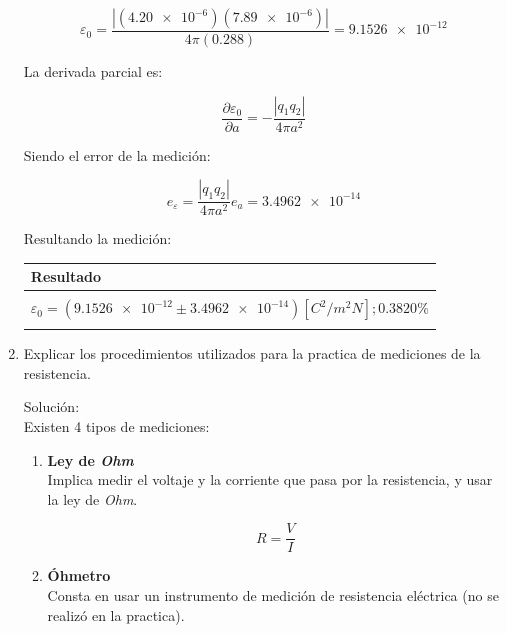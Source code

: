 \documentclass[letter,11pt]{article}
\begin{document}
\begin{enumerate}
    \begin{equation*}
        \varepsilon_0 = \frac{|(\num{4.20e-6})(\num{7.89e-6})|}{4 \pi (0.288)} = \num{9.1526e-12}
    \end{equation*}

    La derivada parcial es:

    \begin{equation*}
        \frac{\partial{\varepsilon_0}}{\partial{a}} = -\frac{|q_1 q_2|}{4 \pi a^2}
    \end{equation*}

    Siendo el error de la medición:

    \begin{equation*}
        e_\varepsilon = \frac{|q_1 q_2|}{4 \pi a^2} e_a = \num{3.4962e-14}
    \end{equation*}

    Resultando la medición:

    \begin{center}
    \begin{tabular}{|>{\centering}m{11.0cm}<{\centering}|}
    \hline
    \textbf{Resultado}
    \tabularnewline \hline
    \\
    $\varepsilon_0 = (\num{9.1526e-12} \pm \num{3.4962e-14}) [C^2/m^2 N]; 0.3820\%$ \tabularnewline
    \\
    \hline
    \end{tabular}
    \end{center}

\newpage
\item Explicar los procedimientos utilizados para la practica de mediciones de
    la resistencia.

    Solución: \\
    Existen 4 tipos de mediciones:

    \begin{enumerate}
        \item \textbf{Ley de \emph{Ohm}} \\
        Implica medir el voltaje y la corriente que pasa por la resistencia, y
        usar la ley de \emph{Ohm}.

        \begin{equation*}
            R = \frac{V}{I}
        \end{equation*}
    
        \item \textbf{Óhmetro} \\
        Consta en usar un instrumento de medición de resistencia eléctrica (no
        se realizó en la practica).


\end{enumerate}
\end{enumerate}
\end{document}

